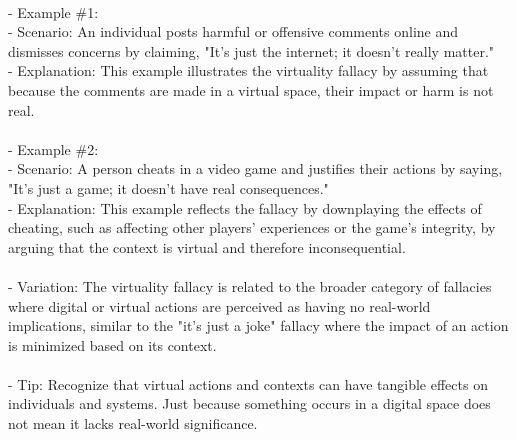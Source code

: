 \documentclass[a4paper,12pt,single,pdftex]{scrartcl}
\begin{document}
    
      
    \\

    
      - Example \#1:
    \\

    
        - Scenario: An individual posts harmful or offensive comments online and dismisses concerns by claiming, "It’s just the internet; it doesn’t really matter."
    \\

    
        - Explanation: This example illustrates the virtuality fallacy by assuming that because the comments are made in a virtual space, their impact or harm is not real.
    \\

    
      
    \\

    
      - Example \#2:
    \\

    
        - Scenario: A person cheats in a video game and justifies their actions by saying, "It’s just a game; it doesn’t have real consequences."
    \\

    
        - Explanation: This example reflects the fallacy by downplaying the effects of cheating, such as affecting other players' experiences or the game's integrity, by arguing that the context is virtual and therefore inconsequential.
    \\

    
      
    \\

    
      - Variation: The virtuality fallacy is related to the broader category of fallacies where digital or virtual actions are perceived as having no real-world implications, similar to the "it’s just a joke" fallacy where the impact of an action is minimized based on its context.
    \\

    
      
    \\

    
      - Tip: Recognize that virtual actions and contexts can have tangible effects on individuals and systems. Just because something occurs in a digital space does not mean it lacks real-world significance.
    \\

    
      
\end{document}
